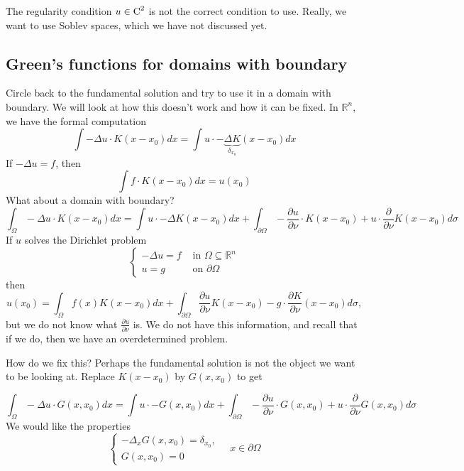 \begin{remark}
The regularity condition $u\in\operatorname{C}^2$ is not the correct condition to use. Really, we want to use Soblev spaces, which we have not discussed yet.
\end{remark}

\subsection{Green's functions for domains with boundary} 
Circle back to the fundamental solution and try to use it in a domain with boundary. We will look at how this doesn't work and how it can be fixed. In $\mathbb{R}^{n}$, we have the formal computation
$$
\int-\Delta u \cdot K\left(x-x_{0}\right) d x=\int u \cdot-\underbrace{\Delta K}_{\delta_{x_{0}}}\left(x-x_{0}\right) d x
$$
If $-\Delta u=f$, then
$$
\int f \cdot K\left(x-x_{0}\right) d x=u\left(x_{0}\right)
$$
What about a domain with boundary?
$$
\int_{\Omega}-\Delta u \cdot K\left(x-x_{0}\right) d x=\int u \cdot-\Delta K\left(x-x_{0}\right) d x+\int_{\partial \Omega}-\frac{\partial u}{\partial \nu} \cdot K\left(x-x_{0}\right)+u \cdot \frac{\partial}{\partial \nu} K\left(x-x_{0}\right) d \sigma
$$
If $u$ solves the Dirichlet problem
$$
\begin{cases}-\Delta u=f & \text { in } \Omega \subseteq \mathbb{R}^{n} \\ u=g & \text { on } \partial \Omega\end{cases}
$$
then
$$
u\left(x_{0}\right)=\int_{\Omega} f(x) K\left(x-x_{0}\right) d x+\int_{\partial \Omega} \frac{\partial u}{\partial \nu} K\left(x-x_{0}\right)-g \cdot \frac{\partial K}{\partial \nu}\left(x-x_{0}\right) d \sigma,
$$
but we do not know what $\frac{\partial u}{\partial \nu}$ is. We do not have this information, and recall that if we do, then we have an overdetermined problem.

How do we fix this? Perhaps the fundamental solution is not the object we want to be looking at. Replace $K\left(x-x_{0}\right)$ by $G\left(x, x_{0}\right)$ to get

$$
\int_{\Omega}-\Delta u \cdot G\left(x,x_{0}\right) d x=\int u \cdot-G\left(x,x_{0}\right) d x+\int_{\partial \Omega}-\frac{\partial u}{\partial \nu} \cdot G\left(x,x_{0}\right)+u \cdot \frac{\partial}{\partial \nu} G\left(x,x_{0}\right) d \sigma
$$
We would like the properties
$$
\left\{\begin{array}{l}
-\Delta_{x} G\left(x, x_{0}\right)=\delta_{x_{0}}, \\
G\left(x, x_{0}\right)=0
\end{array} \quad x \in \partial \Omega\right.
$$

